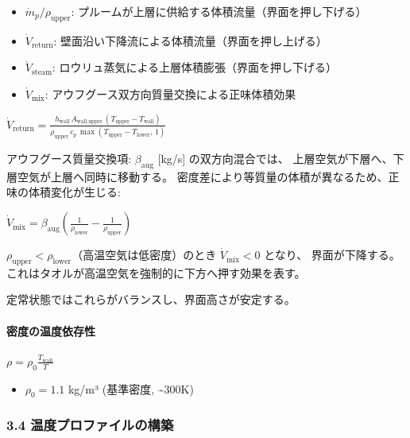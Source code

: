 \documentclass[a4paper,11pt]{article}
\begin{document}
\begin{itemize} \item $\dot{m}_p / \rho_{\text{upper}}$: プルームが上層に供給する体積流量（界面を押し下げる） \end{itemize}
\begin{itemize} \item $\dot{V}_{\text{return}}$: 壁面沿い下降流による体積流量（界面を押し上げる） \end{itemize}
\begin{itemize} \item $\dot{V}_{\text{steam}}$: ロウリュ蒸気による上層体積膨張（界面を押し下げる） \end{itemize}
\begin{itemize} \item $\dot{V}_{\text{mix}}$: アウフグース双方向質量交換による正味体積効果 \end{itemize}

$
\dot{V}_{\text{return}} = \frac{h_{\text{wall}} \, A_{\text{wall,upper}} \, (T_{\text{upper}} - T_{\text{wall}})}{\rho_{\text{upper}} \, c_p \, \max(T_{\text{upper}} - T_{\text{lower}}, \, 1)}
$

アウフグース質量交換項: $\beta_{\text{aug}}$ [kg/s] の双方向混合では、
上層空気が下層へ、下層空気が上層へ同時に移動する。
密度差により等質量の体積が異なるため、正味の体積変化が生じる:

$
\dot{V}_{\text{mix}} = \beta_{\text{aug}} \left( \frac{1}{\rho_{\text{lower}}} - \frac{1}{\rho_{\text{upper}}} \right)
$

$\rho_{\text{upper}} < \rho_{\text{lower}}$（高温空気は低密度）のとき $\dot{V}_{\text{mix}} < 0$ となり、
界面が下降する。これはタオルが高温空気を強制的に下方へ押す効果を表す。

定常状態ではこれらがバランスし、界面高さが安定する。

\paragraph{密度の温度依存性}

$
\rho = \rho_0 \frac{T_{\text{wall}}}{T}
$

\begin{itemize} \item $\rho_0 = 1.1$ kg/m³ (基準密度, \textasciitilde{}300K) \end{itemize}

\subsubsection{3.4 温度プロファイルの構築}
\end{document}
